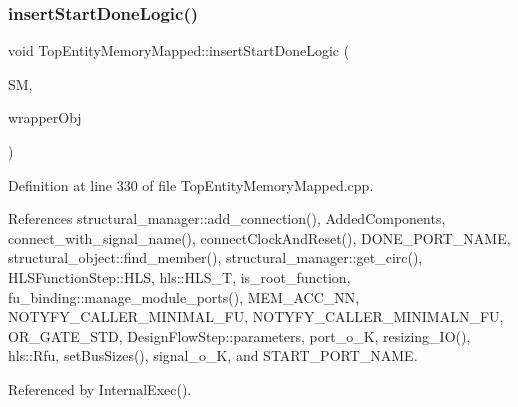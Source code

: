 \subsubsection{\texorpdfstring{insert\+Start\+Done\+Logic()}{insertStartDoneLogic()}}
{\footnotesize\ttfamily void Top\+Entity\+Memory\+Mapped\+::insert\+Start\+Done\+Logic (\begin{DoxyParamCaption}\item[{\hyperlink{structural__manager_8hpp_ab3136f0e785d8535f8d252a7b53db5b5}{structural\+\_\+manager\+Ref}}]{SM,  }\item[{\hyperlink{structural__objects_8hpp_a8ea5f8cc50ab8f4c31e2751074ff60b2}{structural\+\_\+object\+Ref}}]{wrapper\+Obj }\end{DoxyParamCaption})\hspace{0.3cm}{\ttfamily [private]}}



Definition at line 330 of file Top\+Entity\+Memory\+Mapped.\+cpp.



References structural\+\_\+manager\+::add\+\_\+connection(), Added\+Components, connect\+\_\+with\+\_\+signal\+\_\+name(), connect\+Clock\+And\+Reset(), D\+O\+N\+E\+\_\+\+P\+O\+R\+T\+\_\+\+N\+A\+ME, structural\+\_\+object\+::find\+\_\+member(), structural\+\_\+manager\+::get\+\_\+circ(), H\+L\+S\+Function\+Step\+::\+H\+LS, hls\+::\+H\+L\+S\+\_\+T, is\+\_\+root\+\_\+function, fu\+\_\+binding\+::manage\+\_\+module\+\_\+ports(), M\+E\+M\+\_\+\+A\+C\+C\+\_\+\+NN, N\+O\+T\+Y\+F\+Y\+\_\+\+C\+A\+L\+L\+E\+R\+\_\+\+M\+I\+N\+I\+M\+A\+L\+\_\+\+FU, N\+O\+T\+Y\+F\+Y\+\_\+\+C\+A\+L\+L\+E\+R\+\_\+\+M\+I\+N\+I\+M\+A\+L\+N\+\_\+\+FU, O\+R\+\_\+\+G\+A\+T\+E\+\_\+\+S\+TD, Design\+Flow\+Step\+::parameters, port\+\_\+o\+\_\+K, resizing\+\_\+\+I\+O(), hls\+::\+Rfu, set\+Bus\+Sizes(), signal\+\_\+o\+\_\+K, and S\+T\+A\+R\+T\+\_\+\+P\+O\+R\+T\+\_\+\+N\+A\+ME.



Referenced by Internal\+Exec().


